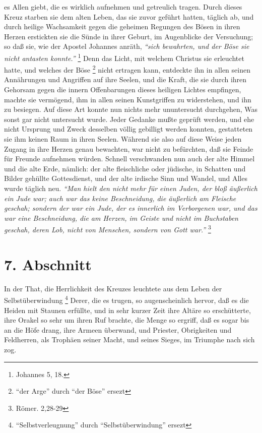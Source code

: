 es Allen giebt, die es wirklich aufnehmen und getreulich tragen. Durch dieses
Kreuz starben sie dem alten Leben, das sie zuvor geführt hatten, täglich ab, und
durch heilige Wachsamkeit gegen die geheimen Regungen des Bösen in ihren Herzen
erstickten sie die Sünde in ihrer Geburt, im Augenblicke der Versuchung; so daß
sie, wie der Apostel Johannes anräth,
\textit{"`sich bewahrten, und der Böse sie nicht antasten konnte."'}
\footnote{Johannes 5, 18.}
Denn das Licht, mit welchem Christus sie erleuchtet hatte, und welches der Böse
\footnote{"`der Arge"' durch "`der Böse"' ersezt}
nicht ertragen kann, entdeckte ihn in allen seinen Annährungen und Angriffen auf
ihre Seelen, und die Kraft, die sie durch ihren Gehorsam gegen die innern
Offenbarungen dieses heiligen Lichtes empfingen, machte sie vermögend, ihm in
allen seinen Kunstgriffen zu widerstehen, und ihn zu besiegen. Auf diese Art
konnte nun nichts mehr ununtersucht durchgehen, Was sonst gar nicht untersucht
wurde. Jeder Gedanke mußte geprüft werden, und ehe nicht Ursprung und Zweck
desselben völlig gebilligt werden konnten, gestatteten sie ihm keinen Raum in
ihren Seelen. Während sie also auf diese Weise jeden Zugang in ihre Herzen genau
bewachten, war nicht zu befürchten, daß sie Feinde für Freunde aufnehmen würden.
Schnell verschwanden nun auch der alte Himmel und die alte Erde, nämlich: der
alte fleischliche oder jüdische, in Schatten und Bilder gehüllte Gottesdienst,
und der alte irdische Sinn und Wandel, und Alles wurde täglich neu.
\textit{"`Man hielt
den nicht mehr für einen Juden, der bloß äußerlich ein Jude war; auch war das
keine Beschneidung, die äußerlich am Fleische geschah; sondern der war ein Jude,
der es innerlich im Verborgenen war, und das war eine Beschneidung, die am
Herzen, im Geiste und nicht im Buchstaben geschah, deren Lob, nicht von
Menschen, sondern von Gott war."'}
\footnote{Römer. 2,28-29}

\section{7. Abschnitt}  \label{kap2_ab7}

In der That, die Herrlichkeit des Kreuzes leuchtete aus dem Leben der
Selbstüberwindung \footnote{"`Selbstverleugnung"' durch "`Selbstüberwindung"'
ersezt} Derer, die es trugen, so augenscheinlich hervor, daß es die
Heiden mit Staunen erfüllte, und in sehr kurzer Zeit ihre Altäre so
erschütterte, ihre Orakel so sehr um ihren Ruf brachte, die Menge so ergriff,
daß es sogar bis an die Höfe drang, ihre Armeen überwand, und Priester,
Obrigkeiten und Feldherren, als Trophäen seiner Macht, und seines Sieges, im
Triumphe nach sich zog.

